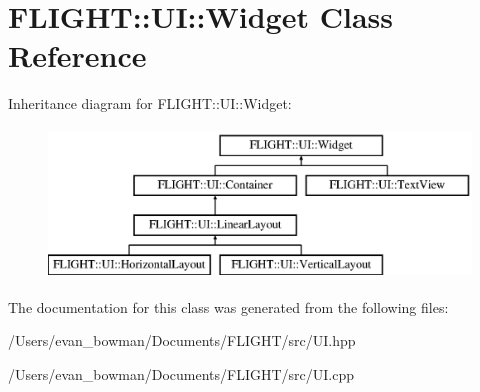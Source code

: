 \hypertarget{class_f_l_i_g_h_t_1_1_u_i_1_1_widget}{}\section{F\+L\+I\+G\+HT\+:\+:UI\+:\+:Widget Class Reference}
\label{class_f_l_i_g_h_t_1_1_u_i_1_1_widget}
Inheritance diagram for F\+L\+I\+G\+HT\+:\+:UI\+:\+:Widget\+:\begin{figure}[H]
\begin{center}
\leavevmode
\includegraphics[height=4.000000cm]{class_f_l_i_g_h_t_1_1_u_i_1_1_widget}
\end{center}
\end{figure}


The documentation for this class was generated from the following files\+:\begin{DoxyCompactItemize}
\item 
/\+Users/evan\+\_\+bowman/\+Documents/\+F\+L\+I\+G\+H\+T/src/U\+I.\+hpp\item 
/\+Users/evan\+\_\+bowman/\+Documents/\+F\+L\+I\+G\+H\+T/src/U\+I.\+cpp\end{DoxyCompactItemize}
